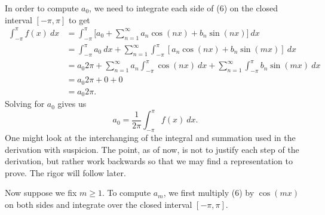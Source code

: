 In order to compute \( a_{0} \), we need to integrate each side of (6) on the closed interval \( [ - \pi, \pi ] \) to get 
\begin{align*}
    \int_{ -\pi  }^{ \pi  } f(x) \ dx &= \int_{ -\pi  }^{ \pi  } \Big[ a_{0} + \sum_{ n=1 }^{ \infty  } a_{n} \cos(nx) + b_{n} \sin(nx) \Big] \ dx \\
                                      &= \int_{ -\pi  }^{ \pi  } a_{0} \ dx + \sum_{ n=1 }^{ \infty  } \int_{ -\pi  }^{ \pi  } [ a_{n} \cos(nx) + b_{n} \sin(mx)] \ dx \\
                                      &= a_{0}2\pi + \sum_{ n=1 }^{ \infty  } a_{n} \int_{ -\pi  }^{ \pi  } \cos(nx) \ dx + \sum_{ n=1 }^{ \infty  } \int_{ -\pi  }^{ \pi  } b_{n} \sin(mx) \ dx \\
                                      &= a_{0} 2 \pi + 0 + 0 \\
                                      &= a_{0 } 2 \pi.
\end{align*}
Solving for \( a_{0} \) gives us 
\[  a_{0} = \frac{ 1 }{ 2\pi  } \int_{ - \pi  }^{ \pi  } f(x) \ dx. \tag{9} \]
One might look at the interchanging of the integral and summation used in the derivation with suspicion. The point, as of now, is not to justify each step of the derivation, but rather work backwards so that we may find a representation to prove. The rigor will follow later.

Now suppose we fix \( m \geq 1  \). To compute \( a_{m} \), we first multiply (6) by \( \cos(mx)  \) on both sides and integrate over the closed interval \( [ -\pi, \pi]  \).

